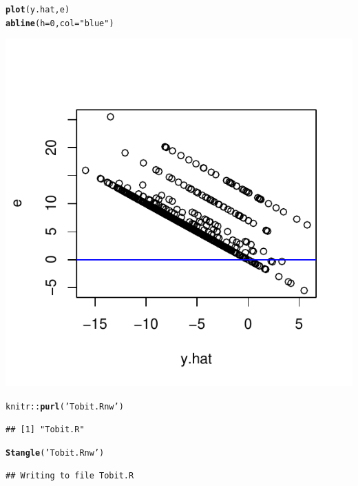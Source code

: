 \documentclass[onesided]{article}\usepackage[]{graphicx}\usepackage[]{color}
\makeatletter
\def\maxwidth{ %
  \ifdim\Gin@nat@width>\linewidth
    \linewidth
  \else
    \Gin@nat@width
  \fi
}
\newcommand{\hlnum}[1]{\textcolor[rgb]{0.686,0.059,0.569}{#1}}%
\newcommand{\hlstr}[1]{\textcolor[rgb]{0.192,0.494,0.8}{#1}}%
\newcommand{\hlopt}[1]{\textcolor[rgb]{0,0,0}{#1}}%
\newcommand{\hlstd}[1]{\textcolor[rgb]{0.345,0.345,0.345}{#1}}%
\newcommand{\hlkwc}[1]{\textcolor[rgb]{0.333,0.667,0.333}{#1}}%
\newcommand{\hlkwd}[1]{\textcolor[rgb]{0.737,0.353,0.396}{\textbf{#1}}}%
\newenvironment{kframe}{%
 \def\at@end@of@kframe{}%
 \ifinner\ifhmode%
  \def\at@end@of@kframe{\end{minipage}}%
  \begin{minipage}{\columnwidth}%
 \fi\fi%
 \def\FrameCommand##1{\hskip\@totalleftmargin \hskip-\fboxsep
 \colorbox{shadecolor}{##1}\hskip-\fboxsep
     \hskip-\linewidth \hskip-\@totalleftmargin \hskip\columnwidth}%
 \MakeFramed {\advance\hsize-\width
   \@totalleftmargin\z@ \linewidth\hsize
   \@setminipage}}%
 {\par\unskip\endMakeFramed%
 \at@end@of@kframe}
\newenvironment{knitrout}{}{} %
\makeatother
\begin{document}
\begin{knitrout}
\color{fgcolor}\begin{kframe}
\begin{alltt}
\hlkwd{plot}\hlstd{(y.hat, e)}
\hlkwd{abline}\hlstd{(}\hlkwc{h}\hlstd{=}\hlnum{0}\hlstd{,} \hlkwc{col}\hlstd{=}\hlstr{"blue"}\hlstd{)}
\end{alltt}
\end{kframe}

{\centering \includegraphics[width=\maxwidth]{figure/residuals:3-1} 

}



\end{knitrout}


\begin{knitrout}
\color{fgcolor}\begin{kframe}
\begin{alltt}
\hlstd{knitr}\hlopt{::}\hlkwd{purl}\hlstd{(}\hlstr{'Tobit.Rnw'}\hlstd{)}
\end{alltt}
\begin{verbatim}
## [1] "Tobit.R"
\end{verbatim}
\begin{alltt}
\hlkwd{Stangle}\hlstd{(}\hlstr{'Tobit.Rnw'}\hlstd{)}
\end{alltt}
\begin{verbatim}
## Writing to file Tobit.R
\end{verbatim}


{\ttfamily\noindent\bfseries{}}\end{kframe}
\end{knitrout}


\newpage
\paragraph{}
\paragraph{}
\setcounter{page}{1}
\printbibliography
\end{document}
